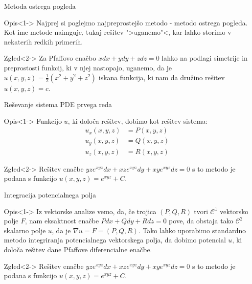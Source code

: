 \documentclass[t, 8pt]{beamer} %
\newcommand{\fillblack}[1]{
	\begin{tikzpicture}[remember picture, overlay]
		\node [shift={(0 cm,0cm)}]  at (current page.south west)
		{%
			\begin{tikzpicture}[remember picture, overlay] at (current page.south west)
				\draw [fill=black] (0, 0) -- (0,#1 \paperheight) --
				(\paperwidth,#1 \paperheight) -- (\paperwidth,0) -- cycle ;
			\end{tikzpicture}
		};
		\draw (current page.north west) rectangle (current page.south east);
	\end{tikzpicture}
}
\begin{document}
		\begin{frame}{Metoda ostrega pogleda}
			\begin{block}{Opis}<1->
					Najprej si poglejmo najpreprostejšo metodo - metodo ostrega pogleda. Kot ime metode naimguje, tukaj rešitev ">uganemo"<, kar lahko storimo v nekaterih redkih primerih. 
			\end{block}
			\begin{block}{Zgled}<2->
					Za Pfaffovo enačbo $xdx + ydy + zdz = 0$ lahko na podlagi simetrije in preprostosti funkcij, ki v njej nastopajo, uganemo, da je $u(x, y, z) = \frac{1}{2}(x^2 + y^2 + z^2)$ iskana funkcija, ki nam da družino rešitev $u(x, y, z) = c$.
			\end{block}
		\end{frame}
		
		\begin{frame}{Reševanje sistema PDE prvega reda}
			\begin{block}{Opis}<1->
				Funkcijo $u$, ki določa rešitev, dobimo kot rešitev sistema: 
				\begin{align*}
					u_x(x, y, z) &= P(x, y, z) \\
					u_y(x, y, z) &= Q(x, y, z) \\
					u_z(x, y, z) &= R(x, y, z) 
				\end{align*}
			\end{block}
			\begin{block}{Zgled}<2->
				Rešitev enačbe $yze^{xyz}dx + xze^{xyz}dy + xye^{xyz}dz = 0$ s to metodo je podana s funkcijo $u(x, y, z) = e^{xyz} + C$.
			\end{block}
		\end{frame}
		
		\begin{frame}{Integracija potencialnega polja}
			\begin{block}{Opis}<1->
				Iz vektorske analize vemo, da, če trojica $(P, Q, R)$ tvori $\mathcal{C}^1$ vektorsko polje $F$, nam eksaktnost enačbe $Pdx + Qdy + Rdz = 0$ pove, da obstaja tako $\mathcal{C}^2$ skalarno polje $u$, da je $\nabla u = F = (P, Q, R)$. Tako lahko uporabimo standardno metodo integriranja potencialnega vektorskega polja, da dobimo potencial $u$, ki določa rešitev dane Pfaffove diferencialne enačbe.
			\end{block}
			\begin{block}{Zgled}<2->
					Rešitev enačbe $yze^{xyz}dx + xze^{xyz}dy + xye^{xyz}dz = 0$ s to metodo je podana s funkcijo $u(x, y, z) = e^{xyz} + C$.
			\end{block}
		\end{frame}
		
\end{document}
